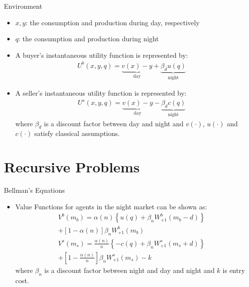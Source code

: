 \documentclass{beamer}
\begin{document}
\begin{frame}{Environment}
    \begin{itemize}
        \item $x,y$: the consumption and production during day, respectively
        \item $q$: the consumption and production during night
 
        \item A buyer's instantaneous utility function is represented by:
        \begin{align*}
         U^{b}(x,y,q) = \underbrace{v(x) - y}_{\text{day}}  + \underbrace{\beta_{d} u(q)}_{\text{night}}
        \end{align*}
        \item A seller's instantaneous utility function is represented by:
        \begin{align*}
         U^{s}(x,y,q) = \underbrace{v(x) - y}_{\text{day}}  - \underbrace{\beta_{d} c(q)}_{\text{night}}
        \end{align*}
        where $\beta_{d}$ is a discount factor between day and night and $v(\cdot)$, $ u(\cdot)$ and $c(\cdot)$ satisfy classical assumptions.

    \end{itemize}
    
\end{frame}
\section{Recursive Problems}
\begin{frame}{Bellman's Equations}
    \begin{itemize}
        \item Value Functions for agents in the night market can be shown as:
        \begin{align*}
            V^{b}(m_{b}) = \alpha(n)\left\{ u(q)+\beta_{n}W_{+1}^{b}(m_{b}-d)\right\} \\+\left[1-\alpha(n)\right]\beta_{n} W_{+1}^{b}(m_{b})\\
            V^{s}(m_{s}) = \frac{\alpha(n)}{n}\left\{ -c(q)+\beta_{n}W_{+1}^{s}(m_{s}+d)\right\} \\+\left[1-\frac{\alpha(n)}{n}\right]\beta_{n} W_{+1}^{s}(m_{s})-k
        \end{align*}
        where $\beta_{n}$ is a discount factor between night and day and night and $k$ is entry cost.
    \end{itemize}
    
\end{frame}
\end{document}
